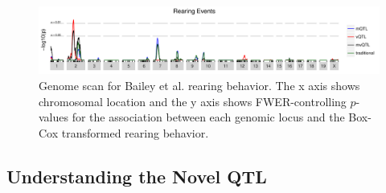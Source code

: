     \begin{figure}
        \includegraphics[width=\textwidth]{images/14_Bailey_rearing_scan.pdf}
        \caption[
            Genome scan for Bailey et al. rearing behavior.
        ]
        {
            Genome scan for Bailey et al. rearing behavior.
            The x axis shows chromosomal location and the y axis shows FWER-controlling $p$-values for the association between each genomic locus and the Box-Cox transformed rearing behavior.
        }
        \label{fig:bailey_scan_rearing}
    \end{figure}



    \subsection{Understanding the Novel QTL}

